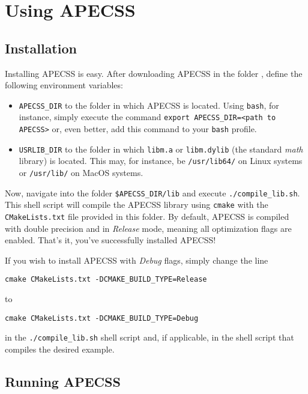 \chapter{Using APECSS}

\section{Installation}
\label{sec:installation}

Installing APECSS is easy. After downloading APECSS in the folder {\tt <path to APECSS>}, define the following environment variables:\vspace{-1em}
\begin{itemize}[noitemsep]
\item {\tt APECSS\_DIR} to the folder in which APECSS is located. Using {\tt bash}, for instance, simply execute the command {\tt export APECSS\_DIR=<path to APECSS>} or, even better, add this command to your {\tt bash} profile.
\item {\tt USRLIB\_DIR} to the folder in which {\tt libm.a} or {\tt libm.dylib} (the standard \textit{math} library) is located. This may, for instance, be {\tt /usr/lib64/} on Linux systems or {\tt /usr/lib/} on MacOS systems.
\end{itemize}

Now, navigate into the folder {\tt \$APECSS\_DIR/lib} and execute {\tt ./compile\_lib.sh}. This shell script will compile the APECSS library using {\tt cmake} with the {\tt CMakeLists.txt} file provided in this folder. By default, APECSS is compiled with double precision and in \textit{Release} mode, meaning all optimization flags are enabled. That's it, you've successfully installed APECSS!

If you wish to install APECSS with \textit{Debug} flags, simply change the line
\begin{lstlisting}[style=CStyle,numbers=none]
  cmake CMakeLists.txt -DCMAKE_BUILD_TYPE=Release
\end{lstlisting}\vspace{-0.75em}
to
\begin{lstlisting}[style=CStyle,numbers=none]
  cmake CMakeLists.txt -DCMAKE_BUILD_TYPE=Debug
\end{lstlisting}\vspace{-0.75em}
in the {\tt ./compile\_lib.sh} shell script and, if applicable, in the shell script that compiles the desired example.

\section{Running APECSS}

